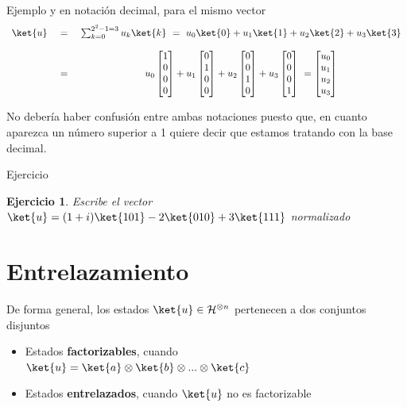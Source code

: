 \documentclass[a4paper,11pt]{book} %
\newtheorem{ejercicio_contador}{Ejercicio}
\newcommand{\Ejercicio}[1]{
		\begin{mybox_gray}{Ejercicio} 
			\begin{ejercicio_contador}
				 #1 
			\end{ejercicio_contador} 
		\end{mybox_gray}
	}
\numberwithin{equation}{chapter}
\begin{document}
\begin{mybox_green}{Ejemplo}
	y en notación decimal, para el mismo vector
	\begin{equation*}
	\begin{array}{ccc}
	\ket{u} ~&=& ~ \sum_{k=0}^{2^2-1=3} u_{k} \ket{k}~=~ u_{0}\ket{0}+ u_{1}\ket{1} + u_{2}\ket{2} +u_{3}\ket{3}
	\\ \\
	~&=&~ u_{0}\begin{bmatrix}1\\0\\0 \\ 0\end{bmatrix}+ u_{1}  \begin{bmatrix}0\\1\\0 \\ 0\end{bmatrix} + u_{2} 
	\begin{bmatrix}0\\0\\1\\0\end{bmatrix}+u_{3}  \begin{bmatrix}0\\0\\0\\1\end{bmatrix}   ~ = 
	\begin{bmatrix}u_{0}\\ u_{1}\\ u_{2} \\ u_{3}  \end{bmatrix}
	\end{array}
	\end{equation*}

	No debería haber confusión entre ambas notaciones puesto que, en cuanto aparezca un número superior a 1 quiere decir que 
	estamos tratando con la base decimal. 
	\end{mybox_green}

	\Ejercicio{
	Escribe el vector $\ket{u} = (1+i)\ket{101} -2\ket{010} + 3\ket{111}$ normalizado
	}
   

   
    \section{Entrelazamiento}



De forma  general, los estados $\ket{u}\in \mathcal{H}^{\otimes n}$ pertenecen a dos conjuntos disjuntos
\begin{itemize}
	\item Estados \textbf{factorizables}, cuando $\ket{u} = \ket{a}\otimes \ket{b}\otimes...\otimes \ket{c}$
	\item Estados \textbf{entrelazados}, cuando $\ket{u}$ no es factorizable
\end{itemize}
\end{document}
